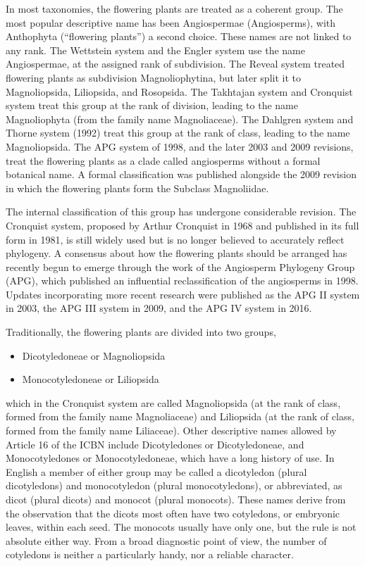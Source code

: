 In most taxonomies, the flowering plants are treated as a coherent group. The most popular descriptive name has been Angiospermae (Angiosperms), with Anthophyta (``flowering plants'') a second choice. These names are not linked to any rank. The Wettstein system and the Engler system use the name Angiospermae, at the assigned rank of subdivision. The Reveal system treated flowering plants as subdivision Magnoliophytina, but later split it to Magnoliopsida, Liliopsida, and Rosopsida. The Takhtajan system and Cronquist system treat this group at the rank of division, leading to the name Magnoliophyta (from the family name Magnoliaceae). The Dahlgren system and Thorne system (1992) treat this group at the rank of class, leading to the name Magnoliopsida. The APG system of 1998, and the later 2003 and 2009 revisions, treat the flowering plants as a clade called angiosperms without a formal botanical name. A formal classification was published alongside the 2009 revision in which the flowering plants form the Subclass Magnoliidae.

The internal classification of this group has undergone considerable revision. The Cronquist system, proposed by Arthur Cronquist in 1968 and published in its full form in 1981, is still widely used but is no longer believed to accurately reflect phylogeny. A consensus about how the flowering plants should be arranged has recently begun to emerge through the work of the Angiosperm Phylogeny Group (APG), which published an influential reclassification of the angiosperms in 1998. Updates incorporating more recent research were published as the APG II system in 2003, the APG III system in 2009, and the APG IV system in 2016.

Traditionally, the flowering plants are divided into two groups,

\begin{itemize}
\tightlist
\item
  Dicotyledoneae or Magnoliopsida
\item
  Monocotyledoneae or Liliopsida
\end{itemize}

which in the Cronquist system are called Magnoliopsida (at the rank of class, formed from the family name Magnoliaceae) and Liliopsida (at the rank of class, formed from the family name Liliaceae). Other descriptive names allowed by Article 16 of the ICBN include Dicotyledones or Dicotyledoneae, and Monocotyledones or Monocotyledoneae, which have a long history of use. In English a member of either group may be called a dicotyledon (plural dicotyledons) and monocotyledon (plural monocotyledons), or abbreviated, as dicot (plural dicots) and monocot (plural monocots). These names derive from the observation that the dicots most often have two cotyledons, or embryonic leaves, within each seed. The monocots usually have only one, but the rule is not absolute either way. From a broad diagnostic point of view, the number of cotyledons is neither a particularly handy, nor a reliable character.

